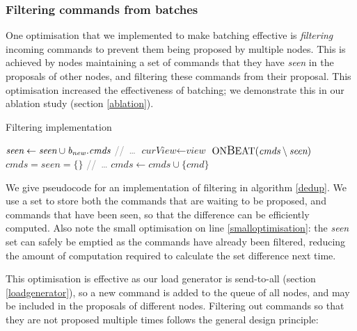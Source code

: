 \subsubsection{Filtering commands from batches} \label{filtering}
One optimisation that we implemented to make batching effective is \textit{filtering} incoming commands to prevent them being proposed by multiple nodes. This is achieved by nodes maintaining a set of commands that they have \textit{seen} in the proposals of other nodes, and filtering these commands from their proposal. This optimisation increased the effectiveness of batching; we demonstrate this in our ablation study (section \ref{ablation}).

\begin{algorithm}[h!]
	\caption{Filtering implementation} \label{dedup}
	\begin{algorithmic}[1]
			\State $ \textit{seen} \gets \textit{seen} \cup \textit{b\textsubscript{new}.cmds}$
			\State \textcolor{gray}{//\ \dots}
		\EndIf
	\EndProcedure
		\State $ \textit{curView} \gets \textit{view}$
		\State $ \text{ON{\large B}EAT}(\textit{cmds} \setminus \textit{seen})$
		\State $ \textit{cmds} = \textit{seen} = \{\}$ \label{smalloptimisation}
		\State \textcolor{gray}{//\ \dots}
	\EndProcedure
		\State $ \textit{cmds} \gets \textit{cmds} \cup \{\textit{cmd}\} $
	\EndProcedure
	\end{algorithmic}
\end{algorithm}

We give pseudocode for an implementation of filtering in algorithm \ref{dedup}. We use a set to store both the commands that are waiting to be proposed, and commands that have been seen, so that the difference can be efficiently computed. Also note the small optimisation on line \ref{smalloptimisation}: the \textit{seen} set can safely be emptied as the commands have already been filtered, reducing the amount of computation required to calculate the set difference next time.

This optimisation is effective as our load generator is send-to-all (section \ref{loadgenerator}), so a new command is added to the queue of all nodes, and may be included in the proposals of different nodes. Filtering out commands so that they are not proposed multiple times follows the general design principle:

